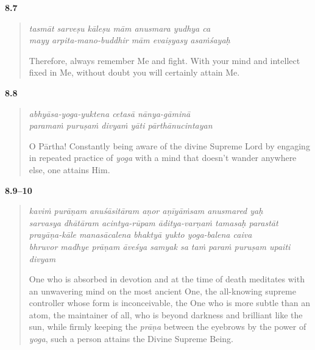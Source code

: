 \par\noindent\textbf{8.7}\par
\begin{verse}
\textit{tasmāt sarveṣu kāleṣu mām anusmara yudhya ca} \\
\textit{mayy arpita-mano-buddhir mām evaiṣyasy asaṁśayaḥ}

\noindent Therefore, always remember Me and fight. With your mind and intellect fixed in Me, without doubt you will certainly attain Me.
\end{verse}
\par



\par\noindent\textbf{8.8}\par
\begin{verse}
\textit{abhyāsa-yoga-yuktena cetasā nānya-gāminā} \\
\textit{paramaṁ puruṣaṁ divyaṁ yāti pārthānucintayan}

\noindent O Pārtha! Constantly being aware of the divine Supreme Lord by engaging in repeated practice of \textit{yoga} with a mind that doesn't wander anywhere else, one attains Him.
\end{verse}
\par



\par\noindent\textbf{8.9–10}\par
\begin{verse}
\textit{kaviṁ purāṇam anuśāsitāram aṇor aṇīyāṁsam anusmared yaḥ} \\
\textit{sarvasya dhātāram acintya-rūpam āditya-varṇaṁ tamasaḥ parastāt} \\
\textit{prayāṇa-kāle manasācalena bhaktyā yukto yoga-balena caiva} \\
\textit{bhruvor madhye prāṇam āveśya samyak sa taṁ paraṁ puruṣam upaiti divyam}

\noindent One who is absorbed in devotion and at the time of death meditates with an unwavering mind on the most ancient One, the all-knowing supreme controller whose form is inconceivable, the One who is more subtle than an atom, the maintainer of all, who is beyond darkness and brilliant like the sun, while firmly keeping the \textit{prāṇa} between the eyebrows by the power of \textit{yoga}, such a person attains the Divine Supreme Being.
\end{verse}
\par



